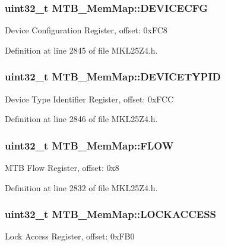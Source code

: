 \subsubsection[{\texorpdfstring{D\+E\+V\+I\+C\+E\+C\+FG}{DEVICECFG}}]{\setlength{\rightskip}{0pt plus 5cm}uint32\+\_\+t M\+T\+B\+\_\+\+Mem\+Map\+::\+D\+E\+V\+I\+C\+E\+C\+FG}\hypertarget{struct_m_t_b___mem_map_a85b25744edf0f8a61d1d40bdf636e87e}{}\label{struct_m_t_b___mem_map_a85b25744edf0f8a61d1d40bdf636e87e}
Device Configuration Register, offset\+: 0x\+F\+C8 

Definition at line 2845 of file M\+K\+L25\+Z4.\+h.

\subsubsection[{\texorpdfstring{D\+E\+V\+I\+C\+E\+T\+Y\+P\+ID}{DEVICETYPID}}]{\setlength{\rightskip}{0pt plus 5cm}uint32\+\_\+t M\+T\+B\+\_\+\+Mem\+Map\+::\+D\+E\+V\+I\+C\+E\+T\+Y\+P\+ID}\hypertarget{struct_m_t_b___mem_map_ae15d7775b4603c2f81ab69dcd560c523}{}\label{struct_m_t_b___mem_map_ae15d7775b4603c2f81ab69dcd560c523}
Device Type Identifier Register, offset\+: 0x\+F\+CC 

Definition at line 2846 of file M\+K\+L25\+Z4.\+h.

\subsubsection[{\texorpdfstring{F\+L\+OW}{FLOW}}]{\setlength{\rightskip}{0pt plus 5cm}uint32\+\_\+t M\+T\+B\+\_\+\+Mem\+Map\+::\+F\+L\+OW}\hypertarget{struct_m_t_b___mem_map_a69ea771a865eb621e80af63894c65982}{}\label{struct_m_t_b___mem_map_a69ea771a865eb621e80af63894c65982}
M\+TB Flow Register, offset\+: 0x8 

Definition at line 2832 of file M\+K\+L25\+Z4.\+h.

\subsubsection[{\texorpdfstring{L\+O\+C\+K\+A\+C\+C\+E\+SS}{LOCKACCESS}}]{\setlength{\rightskip}{0pt plus 5cm}uint32\+\_\+t M\+T\+B\+\_\+\+Mem\+Map\+::\+L\+O\+C\+K\+A\+C\+C\+E\+SS}\hypertarget{struct_m_t_b___mem_map_a6fea4948a50a4c0283e2fe15468ddb41}{}\label{struct_m_t_b___mem_map_a6fea4948a50a4c0283e2fe15468ddb41}
Lock Access Register, offset\+: 0x\+F\+B0 

